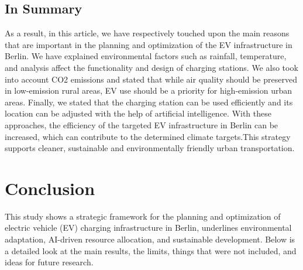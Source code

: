 \subsection{In Summary}
As a result, in this article, we have respectively touched upon the main reasons that are important in the planning and optimization of the EV infrastructure in Berlin. We have explained environmental factors such as rainfall, temperature, and analysis affect the functionality and design of charging stations. We also took into account CO2 emissions and stated that while air quality should be preserved in low-emission rural areas, EV use should be a priority for high-emission urban areas. Finally, we stated that the charging station can be used efficiently and its location can be adjusted with the help of artificial intelligence. With these approaches, the efficiency of the targeted EV infrastructure in Berlin can be increased, which can contribute to the determined climate targets.This strategy supports cleaner, sustainable and environmentally friendly urban transportation.
\fi

\section{Conclusion}
This study shows a strategic framework for the planning and optimization of electric vehicle (EV) charging infrastructure in Berlin, underlines environmental adaptation, AI-driven resource allocation, and sustainable development. Below is a detailed look at the main results, the limits, things that were not included, and ideas for future research.
